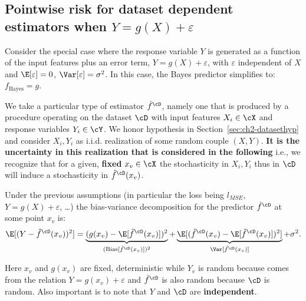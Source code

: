 \subsection{\texorpdfstring{Pointwise risk for dataset dependent estimators when $Y = g(X) + \varepsilon$}{Pointwise risk for dataset dependent estimators when Y = g(X) + epsilon}}
\label{sec:ch2-pointwise}

Consider the special case where the response variable $Y$ is generated as a function
of the input features plus an error term, $Y = g(X) + \varepsilon$, with $\varepsilon$ independent
of $X$ and $\E[\varepsilon] = 0$, $\Var[\varepsilon] = \sigma^2$. In this case, the Bayes predictor simplifies to:
$f_{\text{Bayes}} = g$.

We take a particular type of estimator $\hat{f}^{\cD}$, namely one that is produced by a
procedure operating on the dataset $\cD$ with input features $X_i \in \cX$ and response
variables $Y_i \in \cY$. We honor hypothesis in Section~\ref{sec:ch2-datasethyp} and consider $X_i, Y_i$ as
i.i.d. realization of some random couple $(X, Y)$. \textbf{It is the uncertainty in
this realization that is considered in the following} i.e., we recognize
that for a given, \textbf{fixed} $x_v \in \cX$ the stochasticity in $X_i, Y_i$ thus in $\cD$ will induce
a stochasticity in $\hat{f}^{\cD}(x_v)$.

\begin{proposition}\label{prop:ch2-biasvar}
Under the previous assumptions (in particular the loss
being $l_{MSE}$, $Y = g(X) + \varepsilon$, \ldots) the bias-variance decomposition for the predictor
$\hat{f}^{\cD}$ at some point $x_v$ is:
\begin{equation}\label{eq:ch2-biasvardecomp}
\E[(Y - \hat{f}^{\cD}(x_v))^2] = \underbrace{(g(x_v) - \E[\hat{f}^{\cD}(x_v)])^2}_{(\mathrm{Bias}[\hat{f}^{\cD}(x_v)])^2} + \underbrace{\E[(\hat{f}^{\cD}(x_v) - \E[\hat{f}^{\cD}(x_v)])^2]}_{\Var[\hat{f}^{\cD}(x_v)]} + \sigma^2.
\end{equation}
\end{proposition}

\begin{remark}
Here $x_v$ and $g(x_v)$ are fixed, deterministic while $Y_v$ is random
because comes from the relation $Y = g(x_v) + \varepsilon$ and $\hat{f}^{\cD}$ is also random
because $\cD$ is random. Also important is to note that $Y$ and $\cD$ are \textbf{independent}.
\end{remark}

